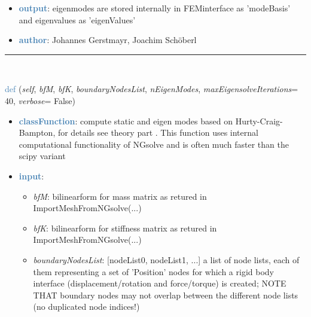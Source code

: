 \begin{itemize}[leftmargin=1.4cm]
\begin{itemize}[leftmargin=1.4cm]
\begin{itemize}[leftmargin=1.4cm]
\begin{itemize}[leftmargin=0.5cm]
\begin{itemize}[leftmargin=1.4cm]
\begin{itemize}[leftmargin=1.4cm]
\begin{itemize}[leftmargin=1.4cm]
\begin{itemize}[leftmargin=0.5cm]
\begin{itemize}[leftmargin=0.7cm]
\begin{itemize}[leftmargin=1.2cm]
\item[]{\it excludeRigidBodyModes}: if rigid body modes are expected (in case of free-free modes), then this number specifies the number of eigenmodes to be excluded in the stored basis (usually 6 modes in 3D)
\item[]{\it maxEigensolveIterations}: maximum number of iterations for iterative eigensolver; default=40
\item[]{\it verbose}: if True, output some relevant information during solving
\end{itemize}
\item[--]\textcolor{steelblue}{\bf output}: eigenmodes are stored internally in FEMinterface as 'modeBasis' and eigenvalues as 'eigenValues'
\item[--]\textcolor{steelblue}{\bf author}: Johannes Gerstmayr, Joachim Schöberl
\vspace{12pt}\end{itemize}
%
\noindent\rule{8cm}{0.75pt}\vspace{1pt} \\ 
\begin{flushleft}
\noindent \textcolor{steelblue}{def {\bf {}}}\label{sec:FEM:FEMinterface:ComputeHurtyCraigBamptonModesNGsolve}
({\it self}, {\it bfM}, {\it bfK}, {\it boundaryNodesList}, {\it nEigenModes}, {\it maxEigensolveIterations}= 40, {\it verbose}= False)
\end{flushleft}
\setlength{\itemindent}{0.7cm}
\begin{itemize}[leftmargin=0.7cm]
\item[--]\textcolor{steelblue}{\bf classFunction}: compute static  and eigen modes based on Hurty-Craig-Bampton, for details see theory part . This function uses internal computational functionality of NGsolve and is often much faster than the scipy variant
\item[--]\textcolor{steelblue}{\bf input}: \vspace{-6pt}
\begin{itemize}[leftmargin=1.2cm]
\setlength{\itemindent}{-0.7cm}
\item[]{\it bfM}: bilinearform for mass matrix as retured in ImportMeshFromNGsolve(...)
\item[]{\it bfK}: bilinearform for stiffness matrix as retured in ImportMeshFromNGsolve(...)
\item[]{\it boundaryNodesList}: [nodeList0, nodeList1, ...] a list of node lists, each of them representing a set of 'Position' nodes for which a rigid body interface (displacement/rotation and force/torque) is created; NOTE THAT boundary nodes may not overlap between the different node lists (no duplicated node indices!)

\end{itemize}
\end{itemize}
\end{itemize}
\end{itemize}
\end{itemize}
\end{itemize}
\end{itemize}
\end{itemize}
\end{itemize}
\end{itemize}
